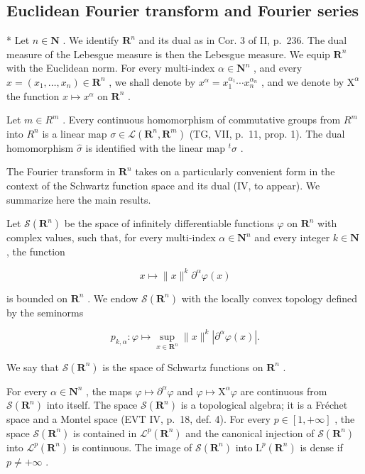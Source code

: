 \subsection{Euclidean Fourier transform and Fourier series}

* Let \(n \in \mathbf{N}\) . We identify \(\mathbf{R}^n\) and its dual as in Cor. 3 of II, p.~236. The dual measure of the Lebesgue measure is then the Lebesgue measure. We equip \(\mathbf{R}^n\) with the Euclidean norm. For every multi-index \(\alpha \in \mathbf{N}^n\) , and every \(x = (x_1, \ldots, x_n) \in \mathbf{R}^n\) , we shall denote by \(x^\alpha = x_1^{\alpha_1} \cdots x_n^{\alpha_n}\) , and we denote by \(\mathrm{X}^\alpha\) the function \(x \mapsto x^\alpha\) on \(\mathbf{R}^n\) .

Let \(m \in R^{m}\) . Every continuous homomorphism of commutative groups from \(R^{m}\) into \(R^{n}\) is a linear map \(\sigma \in \mathcal{L}(\mathbf{R}^{n}, \mathbf{R}^{m})\) (TG, VII, p.~11, prop. 1). The dual homomorphism \(\widehat{\sigma}\) is identified with the linear map \(^{t}\sigma\) .

The Fourier transform in \(\mathbf{R}^n\) takes on a particularly convenient form in the context of the Schwartz function space and its dual (IV, to appear). We summarize here the main results.

Let \(\mathcal{S}(\mathbf{R}^{n})\) be the space of infinitely differentiable functions \(\varphi\) on \(\mathbf{R}^{n}\) with complex values, such that, for every multi-index \(\alpha\in\mathbf{N}^{n}\) and every integer \(k\in\mathbf{N}\) , the function

\[
x \mapsto \| x \| ^ {k} \partial^ {\alpha} \varphi (x)
\]

is bounded on \(\mathbf{R}^{n}\) . We endow \(\mathcal{S}(\mathbf{R}^{n})\) with the locally convex topology defined by the seminorms

\[
p _ {k, \alpha} \colon \varphi \mapsto \sup _ {x \in \mathbf {R} ^ {n}} \| x \| ^ {k} | \partial^ {\alpha} \varphi (x) |.
\]

We say that \(\mathcal{S}(\mathbf{R}^{n})\) is the space of Schwartz functions on \(\mathbf{R}^{n}\) .

For every \(\alpha \in \mathbf{N}^n\) , the maps \(\varphi \mapsto \partial^\alpha \varphi\) and \(\varphi \mapsto \mathrm{X}^\alpha \varphi\) are continuous from \(\mathcal{S}(\mathbf{R}^n)\) into itself. The space \(\mathcal{S}(\mathbf{R}^n)\) is a topological algebra; it is a Fréchet space and a Montel space (EVT IV, p.~18, def. 4). For every \(p \in [1, +\infty]\) , the space \(\mathcal{S}(\mathbf{R}^n)\) is contained in \(\mathcal{L}^p (\mathbf{R}^n)\) and the canonical injection of \(\mathcal{S}(\mathbf{R}^n)\) into \(\mathcal{L}^p (\mathbf{R}^n)\) is continuous. The image of \(\mathcal{S}(\mathbf{R}^n)\) into \(\mathrm{L}^p (\mathbf{R}^n)\) is dense if \(p \neq +\infty\) .

